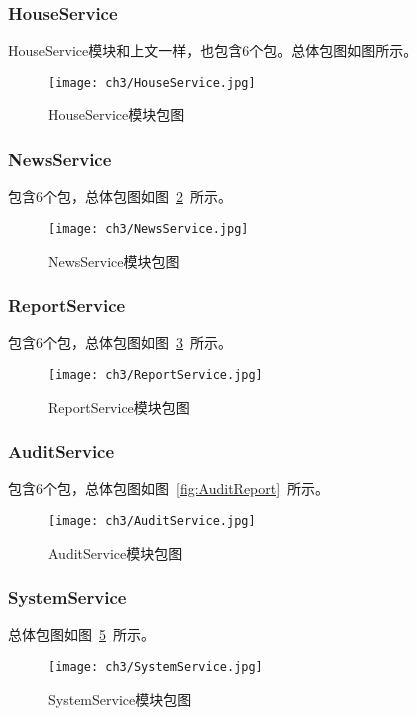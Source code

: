 \subsubsection{HouseService}
HouseService模块和上文一样，也包含6个包。总体包图如图所示。
\begin{figure}[htbp]
    \centering
    \texttt{[image: ch3/HouseService.jpg]}
    \caption{HouseService模块包图}\label{fig:HouseService}
    \vspace{\baselineskip} %
\end{figure}

\subsubsection{NewsService}
包含6个包，总体包图如图~\ref{fig:NewsService}~所示。
\begin{figure}[htbp]
    \centering
    \texttt{[image: ch3/NewsService.jpg]}
    \caption{NewsService模块包图}\label{fig:NewsService}
    \vspace{\baselineskip} %
\end{figure}

\subsubsection{ReportService}
包含6个包，总体包图如图~\ref{fig:ReportService}~所示。
\begin{figure}[htbp]
    \centering
    \texttt{[image: ch3/ReportService.jpg]}
    \caption{ReportService模块包图}\label{fig:ReportService}
    \vspace{\baselineskip} %
\end{figure}

\subsubsection{AuditService}
包含6个包，总体包图如图~\ref{fig:AuditReport}~所示。
\begin{figure}[htbp]
    \centering
    \texttt{[image: ch3/AuditService.jpg]}
    \caption{AuditService模块包图}\label{fig:AuditService}
    \vspace{\baselineskip} %
\end{figure}

\subsubsection{SystemService}
总体包图如图~\ref{fig:SystemService}~所示。
\begin{figure}[htbp]
    \centering
    \texttt{[image: ch3/SystemService.jpg]}
    \caption{SystemService模块包图}\label{fig:SystemService}
    \vspace{\baselineskip} %
\end{figure}



